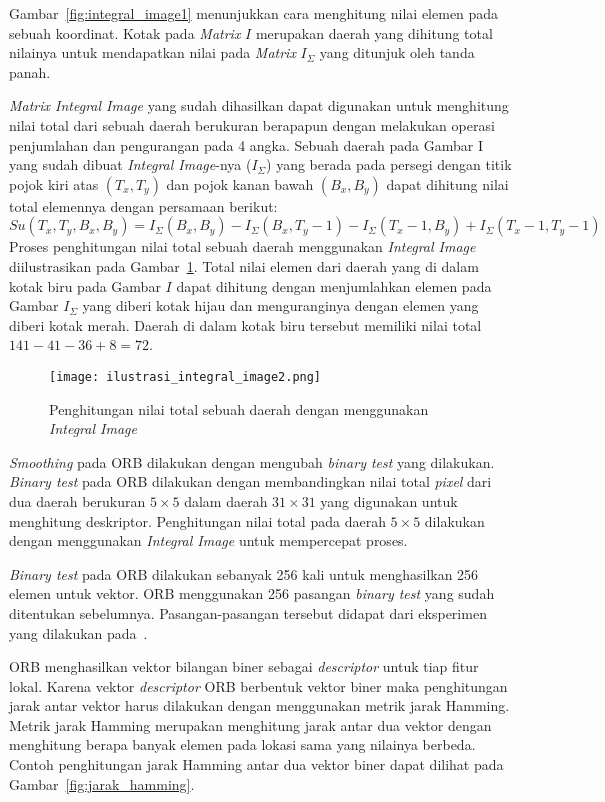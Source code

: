 Gambar~\ref{fig:integral_image1} menunjukkan cara menghitung nilai elemen pada sebuah koordinat. Kotak pada \textit{Matrix} $I$ merupakan daerah yang dihitung total nilainya untuk mendapatkan nilai pada \textit{Matrix} $I_\Sigma$ yang ditunjuk oleh tanda panah. 

\textit{Matrix Integral Image} yang sudah dihasilkan dapat digunakan untuk menghitung nilai total dari sebuah daerah berukuran berapapun dengan melakukan operasi penjumlahan dan pengurangan pada 4 angka. Sebuah daerah pada Gambar I yang sudah dibuat \textit{Integral Image}-nya ($I_\Sigma$) yang berada pada persegi dengan titik pojok kiri atas $(T_x, T_y)$ dan pojok kanan bawah $(B_x, B_y)$ dapat dihitung nilai total elemennya dengan persamaan berikut:
\begin{equation}
	Su(T_x, T_y, B_x, B_y) = I_\Sigma(B_x, B_y) - I_\Sigma(B_x, T_y-1) - I_\Sigma(T_x-1, B_y) + I_\Sigma(T_x-1,T_y-1)
\end{equation}
Proses penghitungan nilai total sebuah daerah menggunakan \textit{Integral Image} diilustrasikan pada Gambar~\ref{fig:integral_image2}. Total nilai elemen dari daerah yang di dalam kotak biru pada Gambar $I$ dapat dihitung dengan menjumlahkan elemen pada Gambar $I_\Sigma$ yang diberi kotak hijau dan menguranginya dengan elemen yang diberi kotak merah. Daerah di dalam kotak biru tersebut memiliki nilai total $141-41-36+8=72$.
\begin{figure}[H]
	\centering
	\texttt{[image: ilustrasi\_integral\_image2.png]}
	\caption{Penghitungan nilai total sebuah daerah dengan menggunakan \textit{Integral Image}}
	\label{fig:integral_image2}
\end{figure}

\textit{Smoothing} pada ORB dilakukan dengan mengubah \textit{binary test} yang dilakukan. \textit{Binary test} pada ORB dilakukan dengan membandingkan nilai total \textit{pixel} dari dua daerah berukuran $5\times5$ dalam daerah $31\times31$ yang digunakan untuk menghitung deskriptor. Penghitungan nilai total pada daerah $5\times5$ dilakukan dengan menggunakan \textit{Integral Image} untuk mempercepat proses. 

\textit{Binary test} pada ORB dilakukan sebanyak 256 kali untuk menghasilkan 256 elemen untuk vektor. ORB menggunakan 256 pasangan \textit{binary test} yang sudah ditentukan sebelumnya. Pasangan-pasangan tersebut didapat dari eksperimen yang dilakukan pada~\cite{rublee2011orb}.

ORB menghasilkan vektor bilangan biner sebagai \textit{descriptor} untuk tiap fitur lokal. Karena vektor \textit{descriptor} ORB berbentuk vektor biner maka penghitungan jarak antar vektor harus dilakukan dengan menggunakan metrik jarak Hamming. Metrik jarak Hamming merupakan menghitung jarak antar dua vektor dengan menghitung berapa banyak elemen pada lokasi sama yang nilainya berbeda. Contoh penghitungan jarak Hamming antar dua vektor biner dapat dilihat pada Gambar~\ref{fig:jarak_hamming}.

